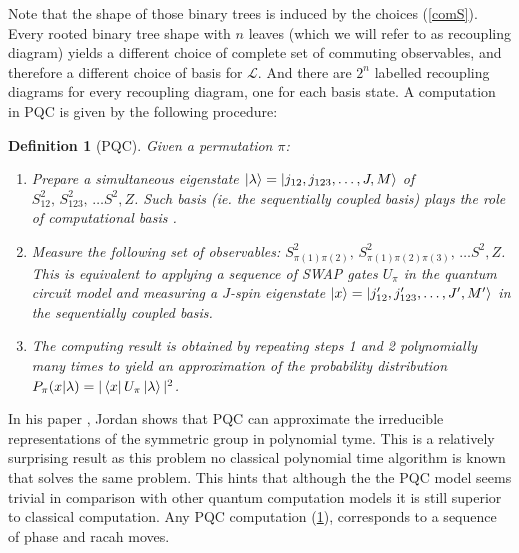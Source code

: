 \documentclass{article}
\newtheorem{definition}{Definition}
\begin{document}
Note that the shape of those binary trees is induced by the choices (\ref{comS}). Every rooted binary tree shape with $n$ leaves (which we will refer to as recoupling diagram) yields a different choice of complete set of commuting observables, and therefore a different choice of basis for $\mathcal{L}$. And there are $2^n$ labelled recoupling diagrams for every recoupling diagram, one for each basis state.
A computation in PQC is given by the following procedure:
\begin{definition}[PQC]\label{pqcomputation} 
	Given a permutation $\pi$: %
	\begin{enumerate}
		\item Prepare a simultaneous eigenstate $\ket{\lambda} = \ket{j_{12}, j_{123}, \ldots, J, M}$ of $ S_{12}^2, \, S_{123}^2, \, \ldots S^2, Z$. Such basis (ie. the sequentially coupled basis) plays the role of computational basis .  %
		\item Measure the following  set of observables: $S_{ \pi(1)\pi(2) }^2, \, S_{ \pi(1)\pi(2)\pi(3) }^2, \, \ldots S^2, Z$. This is equivalent to applying a sequence of \textsf{SWAP} gates $U_\pi$ in the quantum circuit model and measuring a $J$-spin eigenstate $\ket{x} = \ket{j_{12}', j_{123}', \ldots, J', M'}$ in the sequentially coupled basis.	
		\item The computing result is obtained by repeating steps 1 and 2 polynomially many times to yield an approximation of the probability distribution $P_\pi (x|\lambda) = | \bra{x} U_\pi \ket{\lambda}|^2 $.
	\end{enumerate}
\end{definition}
In his paper \cite{Jordan09}, Jordan shows that PQC can approximate the irreducible representations of the symmetric group in polynomial tyme. This is a relatively surprising result as this problem no classical polynomial time algorithm is known that solves the same problem. This hints that although the the PQC model seems trivial in comparison with other quantum computation models it is still superior to classical computation. Any PQC computation (\ref{pqcomputation}), corresponds to a sequence of phase and racah moves.
\end{document}
